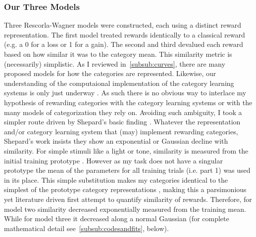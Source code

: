 \documentclass[doc,12pt]{apa}        %
\begin{document}
\subsubsection{Our Three Models}
\label{subsub:catquant}
Three Rescorla-Wagner models were constructed, each using a distinct reward representation.  The first model treated rewards identically to a classical reward (e.g. a 0 for a loss or 1 for a gain).  The second and third devalued each reward based on how similar it was to the category mean.  This similarity metric is (necessarily) simplistic.  As I reviewed in~\ref{subsub:curves}, there are many proposed models for how the categories are represented.  Likewise, our understanding of the computaional implementation of the category learning systems is only just underway \cite{Ashby:2005p9152,Ashby:2006p9153}.  As such there is no obvious way to interlace my hypothesis of rewarding categories with the category learning systems or with the many models of categorization they rely on.  Avoiding such ambiguity, I took a simpler route driven by Shepard's basic finding \cite{Shepard:1987p9102}.  Whatever the representation and/or category learning system that (may) implement rewarding categories, Shepard's work insists they show an exponential or Gaussian decline with similarity.  For simple stimuli like a light or tone, similarity is measured from the initial training prototype \cite{Guttman:1956p8355}.  However as my task does not have a singular prototype the mean of the parameters for all training trials (i.e. part 1) was used in its place.  This simple substitution makes my categories identical to the simplest of the prototype category representations \cite{Rosch:1973p9108,Ashby:1995p9109}, making this a parsimonious yet literature driven first attempt to quantify similarity of rewards.  Therefore, for model two similarity decreased exponentially measured from the training mean.  While for model three it decreased along a normal Gaussian (for complete mathematical detail see~\ref{subsub:codesandfits}, below).  
\end{document}
